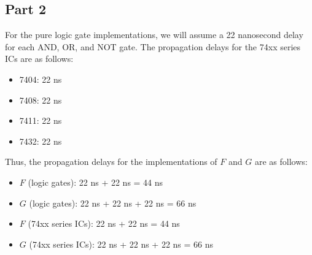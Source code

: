 \documentclass{article}
\begin{document}
\subsection{Part 2}
For the pure logic gate implementations, we will assume a 22 nanosecond delay for each AND, OR, and NOT gate. 
The propagation delays for the 74xx series ICs are as follows:
\begin{itemize}
    \item 7404: 22 ns
    \item 7408: 22 ns
    \item 7411: 22 ns
    \item 7432: 22 ns
\end{itemize}

\noindent Thus, the propagation delays for the implementations of $F$ and $G$ are as follows:

\begin{itemize}
    \item $F$ (logic gates): 22 ns + 22 ns = 44 ns
    \item $G$ (logic gates): 22 ns + 22 ns + 22 ns = 66 ns
    \item $F$ (74xx series ICs): 22 ns + 22 ns = 44 ns
    \item $G$ (74xx series ICs): 22 ns + 22 ns + 22 ns = 66 ns
\end{itemize}
\end{document}
